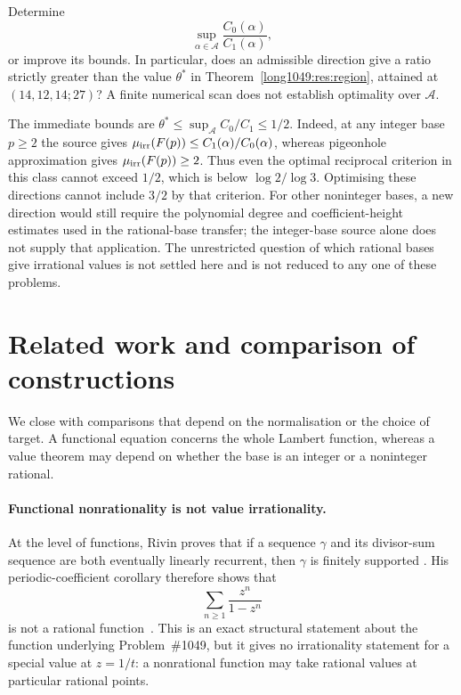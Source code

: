 \documentclass[11pt]{article}
\begin{document}
\begin{problem}
Determine
\[
 \sup_{\alpha\in\mathcal A}\frac{C_0(\alpha)}{C_1(\alpha)},
\]
or improve its bounds. In particular, does an admissible direction give
a ratio strictly greater than the value $\theta^*$ in
Theorem~\ref{long1049:res:region}, attained at $(14,12,14;27)$?
A finite numerical scan does not establish optimality over $\mathcal A$.
\end{problem}

The immediate bounds are $\theta^*\le\sup_{\mathcal A}C_0/C_1\le1/2$.
Indeed, at any integer base $p\ge2$ the source gives
$\mu_{\rm irr}(F(p))\le C_1(\alpha)/C_0(\alpha)$, whereas pigeonhole
approximation gives $\mu_{\rm irr}(F(p))\ge2$.
Thus even the optimal reciprocal criterion in this class cannot exceed
$1/2$, which is below $\log2/\log3$. Optimising these directions cannot
include $3/2$ by that criterion. For other noninteger bases, a new
direction would still require the polynomial degree and coefficient-height
estimates used in the rational-base transfer; the integer-base source
alone does not supply that application.
The unrestricted question of which rational bases give irrational values
is not settled here and is not reduced to any one of these problems.

\section*{Related work and comparison of constructions}
We close with comparisons that depend on the normalisation or the
choice of target. A functional equation concerns the whole Lambert
function, whereas a value theorem may depend on whether the base is
an integer or a noninteger rational.

\paragraph{Functional nonrationality is not value irrationality.}
At the level of functions, Rivin proves that if a sequence \(\gamma\) and its
divisor-sum sequence are both eventually linearly recurrent, then \(\gamma\)
is finitely supported
\cite[Theorem~1.1, p.~2; proof pp.~6--7]{rivin2026}.
His periodic-coefficient corollary therefore shows that
\[
  \sum_{n\ge1}\frac{z^n}{1-z^n}
\]
is not a rational function~\cite[Corollary~6.4, p.~9]{rivin2026}.
This is an exact structural statement about the function underlying
Problem~\#1049, but it gives no irrationality statement for a special value
at \(z=1/t\): a nonrational function may take rational values at particular
rational points.
\end{document}
